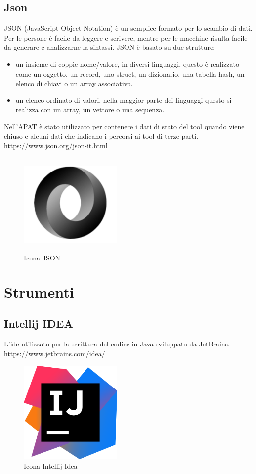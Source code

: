 \subsection*{Json}
JSON (JavaScript Object Notation) è un semplice formato per lo scambio di dati.
Per le persone è facile da leggere e scrivere, mentre per le macchine risulta facile da generare e analizzarne la sintassi.
JSON è basato su due strutture:
\begin{itemize}
    \item un insieme di coppie nome/valore, in diversi linguaggi, questo è realizzato come un oggetto, un record, uno struct, un dizionario, una tabella hash, un elenco di chiavi o un array associativo.
    \item un elenco ordinato di valori, nella maggior parte dei linguaggi questo si realizza con un array, un vettore o una sequenza.
\end{itemize}
Nell'APAT è stato utilizzato per contenere i dati di stato del tool quando viene chiuso e alcuni dati che indicano i percorsi ai tool di terze parti.
\url{https://www.json.org/json-it.html}
\begin{figure}[H]
    \centering
    \includegraphics[width=5cm, height=5cm]{./immagini/json.png}
    \caption{Icona JSON}\label{fig:json}
\end{figure}



\section{Strumenti}\label{sec:strumenti}

\subsection*{Intellij IDEA}
L'\gls{ide} utilizzato per la scrittura del codice in Java sviluppato da JetBrains.
\url{https://www.jetbrains.com/idea/}
\begin{figure}[H]
    \centering
    \includegraphics[width=5cm, height=5cm]{./immagini/intellij.png}
    \caption{Icona Intellij Idea}\label{fig:intellij}
\end{figure}

